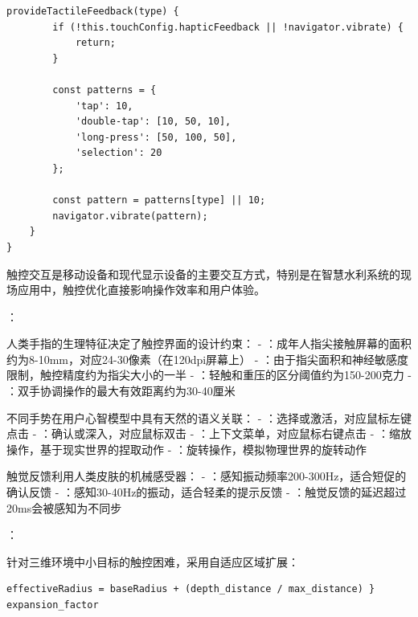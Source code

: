 \begin{lstlisting}[style=javascript]
    provideTactileFeedback(type) {
        if (!this.touchConfig.hapticFeedback || !navigator.vibrate) {
            return;
        }
        
        const patterns = {
            'tap': 10,
            'double-tap': [10, 50, 10],
            'long-press': [50, 100, 50],
            'selection': 20
        };
        
        const pattern = patterns[type] || 10;
        navigator.vibrate(pattern);
    }
}
\end{lstlisting}


触控交互是移动设备和现代显示设备的主要交互方式，特别是在智慧水利系统的现场应用中，触控优化直接影响操作效率和用户体验。

：


人类手指的生理特征决定了触控界面的设计约束： - ：成年人指尖接触屏幕的面积约为8-10mm，对应24-30像素（在120dpi屏幕上） - ：由于指尖面积和神经敏感度限制，触控精度约为指尖大小的一半 - ：轻触和重压的区分阈值约为150-200克力 - ：双手协调操作的最大有效距离约为30-40厘米


不同手势在用户心智模型中具有天然的语义关联： - ：选择或激活，对应鼠标左键点击 - ：确认或深入，对应鼠标双击 - ：上下文菜单，对应鼠标右键点击 - ：缩放操作，基于现实世界的捏取动作 - ：旋转操作，模拟物理世界的旋转动作


触觉反馈利用人类皮肤的机械感受器： - ：感知振动频率200-300Hz，适合短促的确认反馈 - ：感知30-40Hz的振动，适合轻柔的提示反馈 - ：触觉反馈的延迟超过20ms会被感知为不同步

：


针对三维环境中小目标的触控困难，采用自适应区域扩展：

\begin{lstlisting}[style=javascript]
effectiveRadius = baseRadius + (depth_distance / max_distance) } expansion_factor
\end{lstlisting}

